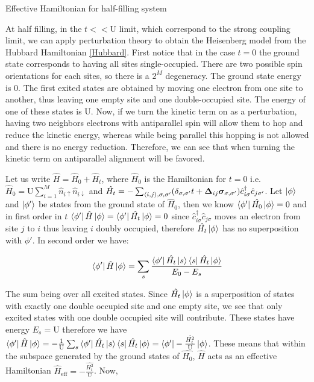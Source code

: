 \begin{section}{Effective Hamiltonian for half-filling system}

At half filling, in the $t << \text{U}$ limit, which correspond to the strong coupling limit, we can apply perturbation theory to obtain the Heisenberg model from the Hubbard Hamiltonian \ref{Hubbard}. First notice that in the case $t = 0$ the ground state corresponds to having all sites single-occupied. There are two possible spin orientations for each sites, so there is a $2^M$ degeneracy. The ground state energy is $0$. The first exited states are obtained by moving one electron from one site to another, thus leaving one empty site and one double-occupied site. The energy of one of these states is $\text{U}$. Now, if we turn the kinetic term on as a perturbation, having two neighbors electrons with antiparallel spin will allow them to hop and reduce the kinetic energy, whereas while being parallel this hopping is not allowed and there is no energy reduction. Therefore, we can see that when turning the kinetic term on antiparallel alignment will be favored. 

Let us write $\hat{H} = \hat{H}_0 + \hat{H}_t$, where $\hat{H}_0$ is the Hamiltonian for $t=0$ i.e. $\hat{H}_0 = \text{U} \sum_{i=1}^M \hat{n}_{i\uparrow}\hat{n}_{i\downarrow}$ and $\hat{H_t} = -\sum_{\langle i,j \rangle, \sigma, \sigma'}(\delta_{\sigma, \sigma'} t + \boldsymbol{\Delta}_{ij} \boldsymbol{\sigma}_{\sigma, \sigma'})\hat{c}_{i \sigma}^\dagger \hat{c}_{j \sigma'}$. Let $\ket{\phi}$ and $\ket{\phi'}$ be states from the ground state of $\hat{H}_0$, then we know $\bra{\phi'} \hat{H_0} \ket{\phi} = 0$ and in first order in $t$ $\bra{\phi'} \hat{H} \ket{\phi} = \bra{\phi'} \hat{H_t} \ket{\phi} = 0$ since $\hat{c}_{i \sigma}^\dagger \hat{c}_{j \sigma}$ moves an electron from site $j$ to $i$ thus leaving $i$ doubly occupied, therefore $\hat{H_t} \ket{\phi}$ has no superposition with $\phi'$. In second order we have:

\begin{equation}
\bra{\phi'} \hat{H} \ket{\phi} = \sum_s \frac{\bra{\phi'} \hat{H_t} \ket{s}\bra{s} \hat{H_t} \ket{\phi}}{E_0-E_s}
\end{equation}

The sum being over all excited states. Since $\hat{H_t}\ket{\phi}$ is a superposition of states with exactly one double occupied site and one empty site, we see that only excited states with one double occupied site will contribute. These states have energy $E_s = \text{U}$ therefore we have $\bra{\phi'} \hat{H} \ket{\phi} = -\frac{1}{\text{U}}\sum_s \bra{\phi'} \hat{H_t} \ket{s}\bra{s} \hat{H_t} \ket{\phi} = \bra{\phi'} -\frac{\hat{H_t^2}}{\text{U}} \ket{\phi}$. These means that within the subspace generated by the ground states of $\hat{H_0}$, $\hat{H}$ acts as an effective Hamiltonian $\hat{H}_{\text{eff}} = -\frac{\hat{H_t^2}}{\text{U}}$. Now,


\end{section}
